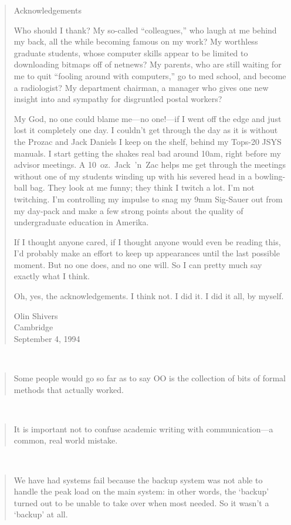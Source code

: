 \documentclass[a4paper]{article}
\begin{document}
\medskip
\begin{quote}
Acknowledgements

Who should I thank? My so-called ``colleagues,'' who laugh at me
behind my back, all the while becoming famous on my work? My
worthless graduate students, whose computer skills appear to be
limited to downloading bitmaps off of netnews? My parents, who
are still waiting for me to quit ``fooling around with computers,''
go to med school, and become a radiologist? My department chairman,
a manager who gives one new insight into and sympathy for
disgruntled postal workers?

My God, no one could blame me---no one!---if I went off the edge
and just lost it completely one day. I couldn't get through the day
as it is without the Prozac and Jack Daniels I keep on the shelf,
behind my Tops-20 JSYS manuals. I start getting the shakes real bad
around 10am, right before my advisor meetings. A 10~oz.\ Jack~'n~Zac
helps me get through the meetings without one of my students
winding up with his severed head in a bowling-ball bag. They look
at me funny; they think I twitch a lot. I'm not twitching. I'm
controlling my impulse to snag my 9mm Sig-Sauer out from my
day-pack and make a few strong points about the quality of
undergraduate education in Amerika.

If I thought anyone cared, if I thought anyone would even be
reading this, I'd probably make an effort to keep up appearances
until the last possible moment. But no one does, and no one will.
So I can pretty much say exactly what I think.

Oh, yes, the acknowledgements. I think not. I did it. I did it
all, by myself.

Olin Shivers \\
Cambridge \\
September 4, 1994
\end{quote}~\cite{Shivers1994}

\medskip
\begin{quote}
	Some people would go so far as to say OO is the collection
	of bits of formal methods that actually worked.
\end{quote}~\cite{AC2008b}

\medskip
\begin{quote}
	It is important not to confuse academic writing with
	communication---a common, real world mistake.
\end{quote}~\cite{AC2008a}

\medskip
\begin{quote}
	We have had systems fail because the backup system was not able to handle
	the peak load on the main system: in other words, the `backup' turned out to
	be unable to take over when most needed. So it wasn't a `backup' at all.
\end{quote}~\cite{Ward2008}
\end{document}
